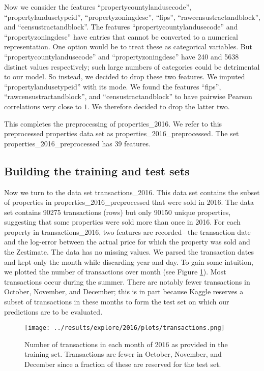\documentclass[12pt]{article}
\begin{document}
Now we consider the features ``propertycountylandusecode'', ``propertylandusetypeid'', ``propertyzoningdesc'', ``fips'', ``rawcensustractandblock'', and ``censustractandblock''. The features ``propertycountylandusecode'' and ``propertyzoningdesc'' have entries that cannot be converted to a numerical representation. One option would be to treat these as categorical variables. But ``propertycountylandusecode'' and ``propertyzoningdesc'' have 240 and 5638 distinct values respectively; such large numbers of categories could be detrimental to our model. So instead, we decided to drop these two features. We imputed ``propertylandusetypeid'' with its mode. We found the features ``fips'', ``rawcensustractandblock'', and ``censustractandblock'' to have pairwise Pearson correlations very close to $1$. We therefore decided to drop the latter two.

This completes the preprocessing of properties\_2016. We refer to this preprocessed properties data set as properties\_2016\_preprocessed. The set properties\_2016\_preprocessed has 39 features.

\subsection{Building the training and test sets}
\label{section-transactions}

Now we turn to the data set transactions\_2016. This data set contains the subset of properties in properties\_2016\_preprocessed that were sold in 2016. The data set contains 90275 transactions (rows) but only 90150 unique properties, suggesting that some properties were sold more than once in 2016. For each property in transactions\_2016, two features are recorded-- the transaction date and the log-error between the actual price for which the property was sold and the Zestimate. The data has no missing values. We parsed the transaction dates and kept only the month while discarding year and day. To gain some intuition, we plotted the number of transactions over month (see Figure \ref{fig-month}). Most transactions occur during the summer. There are notably fewer transactions in October, November, and December; this is in part because Kaggle reserves a subset of transactions in these months to form the test set on which our predictions are to be evaluated.

\begin{figure}
\centering
\texttt{[image: ../results/explore/2016/plots/transactions.png]}
\caption{\label{fig-month} Number of transactions in each month of 2016 as provided in the training set. Transactions are fewer in October, November, and December since a fraction of these are reserved for the test set.}
\end{figure}
\end{document}
